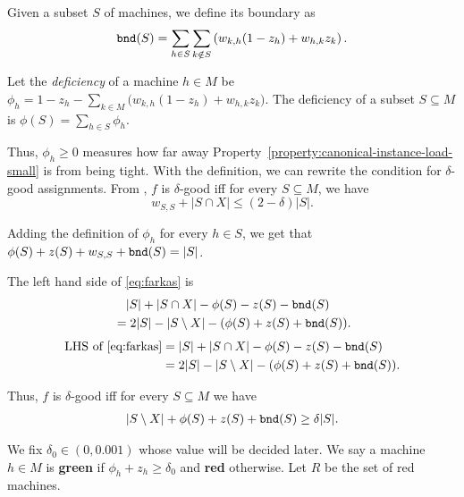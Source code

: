 \documentclass[11pt]{article}
\newenvironment{definition}{\begin{Definition}}{\end{Definition}}
\newtheorem{definition}[lemma]{Definition}
\newcounter{prop}
\newcommand{\cardinal}[1]{\left|#1\right|}
\begin{document}
\def\bnd{{\tt bnd}}
\begin{definition}[Boundary of a set]
Given a subset $S$ of machines, we define its boundary as 
$$\bnd(S) = \sum_{h\in S} \sum_{k\notin S}  \left( w_{k,h}(1-z_h) + w_{h,k}z_{k} \right).$$ 
\end{definition}

\begin{definition}
Let the \emph{deficiency} of a machine $h \in M$ be $\phi_h = 1 \!-\! z_h\! -\! \sum_{k\in M} \big(w_{k,h}(1-z_h) + w_{h,k}z_k\big)$. The deficiency of a subset $S \subseteq M$ is $\phi(S) = \sum_{h \in S}\phi_h$. 
\end{definition}

Thus, $\phi_h \geq 0$ measures how far away Property~\ref{property:canonical-instance-load-small} is from being tight.  With the definition, we can rewrite the condition for $\delta$-good assignments.  From , $f$ is $\delta$-good iff for every $S\subseteq M$, we have 
\begin{equation}
\label{eq:farkas}
w_{S,S} + |S\cap X| \leq (2-\delta)|S|.
\end{equation}

Adding the definition of $\phi_h$ for every $h \in S$, we get that  $\phi(S) + z(S) + w_{S, S} + \bnd(S)  = |S|$.

\ifdefined\CR
The left hand side of \eqref{eq:farkas} is
\begin{align*}
&\quad |S| + \cardinal{S \cap X} - \phi(S) -z(S)- \bnd(S) \\
&=2|S| - |S \setminus X| - (\phi(S)  + z(S) + \bnd(S)).
\end{align*}
\else
\begin{align*}
\text{LHS of \eqref{eq:farkas}}  &=  |S| + \cardinal{S \cap X} - \phi(S) -z(S)- \bnd(S) \\
&=2|S| - |S \setminus X| - (\phi(S)  + z(S) + \bnd(S)).
\end{align*}
\fi

Thus,  $f$ is $\delta$-good iff for every $S \subseteq M$ we have 
\begin{align}
\label{equ:good-assignments-condtion1}
\cardinal{S \setminus X} + \phi(S) + z(S) + \bnd(S) \geq \delta |S|.
\end{align}

We fix $\delta_0 \in (0, 0.001)$ whose value will be decided later. We say a machine $h \in M$ is {\bf green} if $\phi_h + z_h \geq \delta_0$  and {\bf red} otherwise.  Let $R$ be the set of red machines.  
\end{document}
